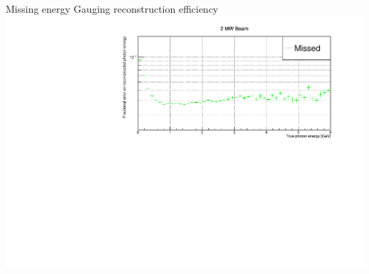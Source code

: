 \documentclass[]{beamer}
\newcommand*{\emphcoltitle}{blue}
\begin{document}
\begin{frame}{Missing energy}{\color{\emphcoltitle} Gauging reconstruction efficiency}
	\centering
	\includegraphics[width=\textwidth]{pile-up/2MW/missed_rel_x}
\end{frame}
\end{document}
